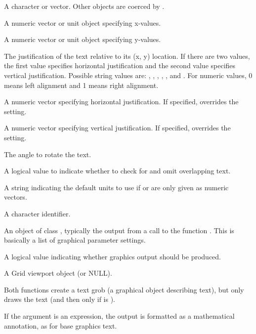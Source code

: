 \begin{Arguments}
\begin{ldescription}
\item[\code{label}] A character or  vector.  Other
objects are coerced by .
\item[\code{x}] A numeric vector or unit object specifying x-values.
\item[\code{y}] A numeric vector or unit object specifying y-values.
\item[\code{just}] The justification of the text 
relative to its (x, y) location.  If there are two values, the first
value specifies horizontal justification and the second value specifies
vertical justification.  Possible string values are: ,
, , , ,
and .  For numeric values, 0 means left alignment
and 1 means right alignment.

\item[\code{hjust}] A numeric vector specifying horizontal justification.
If specified, overrides the  setting.
\item[\code{vjust}] A numeric vector specifying vertical justification.
If specified, overrides the  setting.
\item[\code{rot}] The angle to rotate the text.
\item[\code{check.overlap}] A logical value to indicate whether to
check for and omit overlapping text.
\item[\code{default.units}] A string indicating the default units to use
if  or 
are only given as numeric vectors. 
\item[\code{name}]  A character identifier. 
\item[\code{gp}] An object of class , typically the output
from a call to the function .  This is basically
a list of graphical parameter settings.
\item[\code{draw}] A logical value indicating whether graphics output
should be produced.
\item[\code{vp}] A Grid viewport object (or NULL).
\end{ldescription}
\end{Arguments}
%
\begin{Details}\relax
Both functions create a text grob (a graphical object describing
text), but only 
draws the text (and then only if  is ).

If the  argument is an expression, the output is
formatted as a mathematical annotation, as for base graphics text.

\end{Details}
